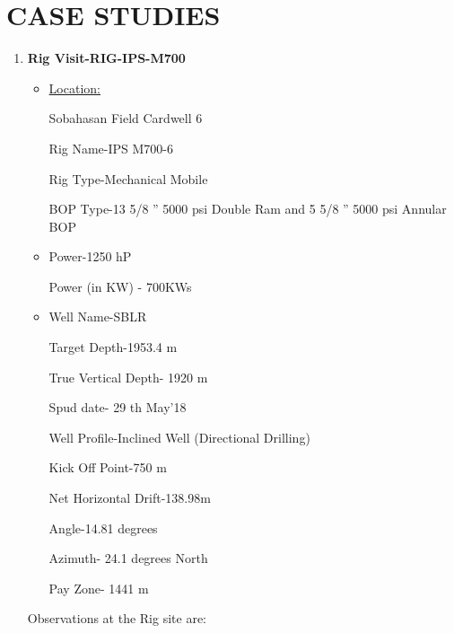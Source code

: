 \chapter{CASE STUDIES}

\onehalfspacing

\begin{enumerate}

\item \textbf{Rig Visit-RIG-IPS-M700}

\begin{itemize}

\item \underline{Location:} 

Sobahasan Field Cardwell 6

Rig Name-IPS M700-6

Rig Type-Mechanical Mobile

BOP Type-13 5/8 ” 5000 psi Double Ram and 5 5/8 ” 5000 psi Annular BOP

\vspace{1em}

\item {}

Power-1250 hP

Power (in KW) - 700KWs

\vspace{1em}

\item {}

Well Name-SBLR

Target Depth-1953.4 m

True Vertical Depth- 1920 m

Spud date- 29 th May’18

Well Profile-Inclined Well (Directional Drilling)

Kick Off Point-750 m

Net Horizontal Drift-138.98m

Angle-14.81 degrees

Azimuth- 24.1 degrees North

Pay Zone- 1441 m

\end{itemize}


\noindent Observations at the Rig site are:


\end{enumerate}
